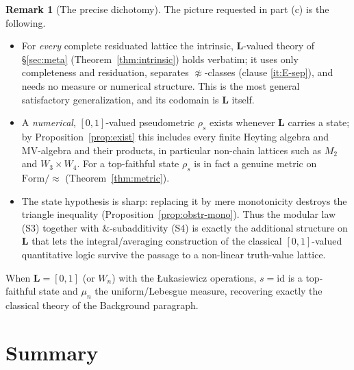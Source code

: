 \documentclass{amsart}
\theoremstyle{definition}
\newtheorem{remark}{Remark}
\theoremstyle{plain}
\newcommand{\bL}{\mathbf{L}}
\newcommand{\Form}{\mathrm{Form}}
\begin{document}
\begin{remark}[The precise dichotomy]\label{rem:obstr-scope}
The picture requested in part (c) is the following.
\begin{itemize}
\item For \emph{every} complete residuated lattice the intrinsic, $\bL$-valued
theory of \S\ref{sec:meta} (Theorem~\ref{thm:intrinsic}) holds verbatim; it uses
only completeness and residuation, separates $\not\approx$-classes (clause
\eqref{it:E-sep}), and needs no measure or numerical structure.  This is the most
general satisfactory generalization, and its codomain is $\bL$ itself.
\item A \emph{numerical}, $[0,1]$-valued pseudometric $\rho_s$ exists whenever
$\bL$ carries a state; by Proposition~\ref{prop:exist} this includes every finite
Heyting algebra and MV-algebra and their products, in particular non-chain
lattices such as $M_2$ and $W_3\times W_4$.  For a top-faithful state $\rho_s$ is
in fact a genuine metric on $\Form/{\approx}$ (Theorem~\ref{thm:metric}).
\item The state hypothesis is sharp: replacing it by mere monotonicity destroys
the triangle inequality (Proposition~\ref{prop:obstr-mono}).  Thus the modular
law (S3) together with $\&$-subadditivity (S4) is exactly the additional
structure on $\bL$ that lets the integral/averaging construction of the classical
$[0,1]$-valued quantitative logic survive the passage to a non-linear truth-value
lattice.
\end{itemize}
When $\bL=[0,1]$ (or $W_n$) with the \L ukasiewicz operations, $s=\mathrm{id}$ is
a top-faithful state and $\mu_n$ the uniform/Lebesgue measure, recovering exactly
the classical theory of the Background paragraph.
\end{remark}

\section{Summary}\label{sec:summary}
\end{document}
